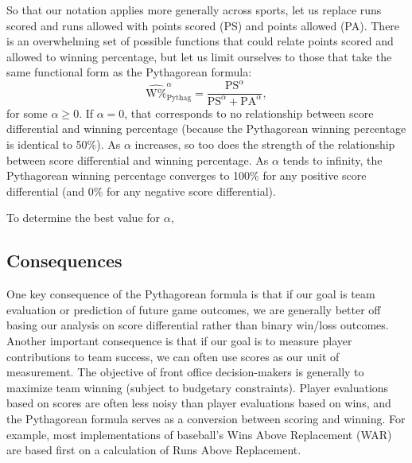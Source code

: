 \documentclass{article}
\begin{document}
So that our notation applies more generally across sports, let us replace runs scored and runs allowed with points scored (PS) and points allowed (PA). There is an overwhelming set of possible functions that could relate points scored and allowed to winning percentage, but let us limit ourselves to those that take the same functional form as the Pythagorean formula:
$$
  \hat{\mbox{W\%}}_{\mbox{Pythag}}^\alpha = \frac{\mbox{PS}^\alpha}{\mbox{PS}^\alpha + \mbox{PA}^\alpha},
$$
for some $\alpha \ge 0$. If $\alpha = 0$, that corresponds to no relationship between score differential and winning percentage (because the Pythagorean winning percentage is identical to 50\%). As $\alpha$ increases, so too does the strength of the relationship between score differential and winning percentage. As $\alpha$ tends to infinity, the Pythagorean winning percentage converges to 100\% for any positive score differential (and 0\% for any negative score differential).

To determine the best value for $\alpha$, 

\subsection{\sc Consequences}

One key consequence of the Pythagorean formula is that if our goal is team evaluation or prediction of future game outcomes, we are generally better off basing our analysis on score differential rather than binary win/loss outcomes. Another important consequence is that if our goal is to measure player contributions to team success, we can often use scores as our unit of measurement. The objective of front office decision-makers is generally to maximize team winning (subject to budgetary constraints). Player evaluations based on scores are often less noisy than player evaluations based on wins, and the Pythagorean formula serves as a conversion between scoring and winning. For example, most implementations of baseball's Wins Above Replacement (WAR) are based first on a calculation of Runs Above Replacement.
\end{document}
